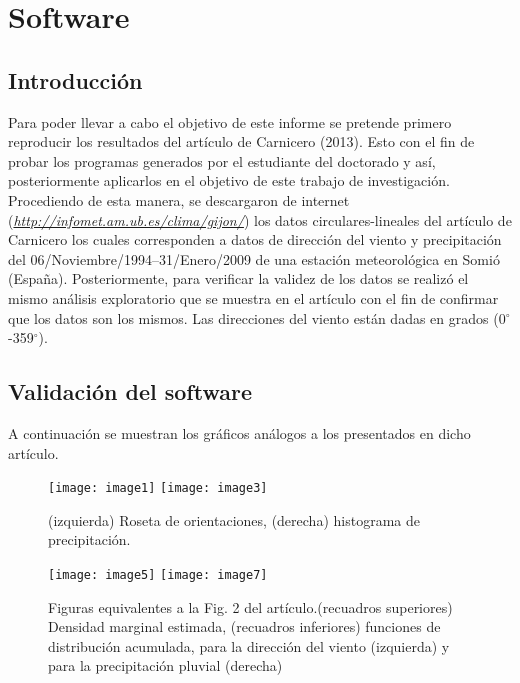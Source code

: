 \chapter{Software}

\section{Introducci\'on}

Para poder llevar a cabo el objetivo de este informe se pretende primero reproducir los resultados del art\'iculo de Carnicero (2013). Esto con el fin de probar los programas generados por el estudiante del doctorado y as\'i, posteriormente aplicarlos en el objetivo de este trabajo de investigaci\'on. Procediendo de esta manera, se descargaron de internet (\href{http://infomet.am.ub.es/clima/gijon/}{\emph{http://infomet.am.ub.es/clima/gijon/}}) los datos circulares-lineales del art\'iculo de Carnicero los cuales corresponden a datos de direcci\'on del viento y precipitaci\'on del 06/Noviembre/1994--31/Enero/2009 de una estaci\'on meteorol\'ogica en Somi\'o (Espa\~na). Posteriormente, para verificar la validez de los datos se realiz\'o el mismo an\'alisis exploratorio que se muestra en el art\'iculo con el fin de confirmar que los datos son los mismos. Las direcciones del viento est\'an dadas en grados (0$^\circ$-359$^\circ$).

\section{Validaci\'on del software}
A continuaci\'on se muestran los gr\'aficos an\'alogos a los presentados en dicho art\'iculo.

\begin{figure}
	\centering
\texttt{[image: image1]} 
\texttt{[image: image3]} 
	\caption{(izquierda) Roseta de orientaciones, (derecha) histograma de precipitaci\'on.}
	\label{f:gijonEDA1D}
\end{figure}

\begin{figure}
	\centering
\texttt{[image: image5]} 
\texttt{[image: image7]} 
	\caption{Figuras equivalentes a la Fig. 2 del art\'iculo.(recuadros superiores) Densidad marginal estimada, (recuadros inferiores) funciones de distribuci\'on acumulada, para la direcci\'on del viento (izquierda) y para la precipitaci\'on pluvial (derecha)}
	\label{f:gijonModels1D}
\end{figure}

